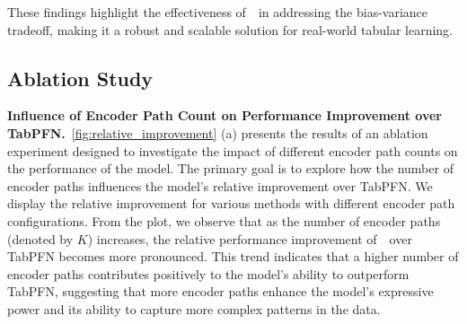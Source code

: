 These findings highlight the effectiveness of~\name~in addressing the bias-variance tradeoff, making it a robust and scalable solution for real-world tabular learning.




\subsection{Ablation Study}
\label{appendix:ablation_study}
\textbf{Influence of Encoder Path Count on Performance Improvement over TabPFN.}~\autoref{fig:relative_improvement} (a) presents the results of an ablation experiment designed to investigate the impact of different encoder path counts on the performance of the model. The primary goal is to explore how the number of encoder paths influences the model’s relative improvement over TabPFN. We display the relative improvement for various methods with different encoder path configurations. From the plot, we observe that as the number of encoder paths (denoted by $K$) increases, the relative performance improvement of~\name~over TabPFN becomes more pronounced. This trend indicates that a higher number of encoder paths contributes positively to the model's ability to outperform TabPFN, suggesting that more encoder paths enhance the model’s expressive power and its ability to capture more complex patterns in the data.

